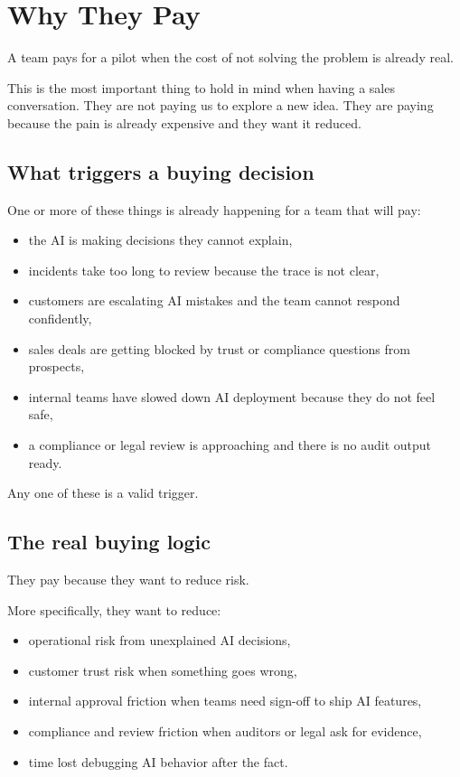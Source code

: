 \chapter{Why They Pay}

A team pays for a pilot when the cost of not solving the problem is already real.

This is the most important thing to hold in mind when having a sales conversation.
They are not paying us to explore a new idea.
They are paying because the pain is already expensive and they want it reduced.

\section{What triggers a buying decision}

One or more of these things is already happening for a team that will pay:

\begin{itemize}
  \item the AI is making decisions they cannot explain,
  \item incidents take too long to review because the trace is not clear,
  \item customers are escalating AI mistakes and the team cannot respond confidently,
  \item sales deals are getting blocked by trust or compliance questions from prospects,
  \item internal teams have slowed down AI deployment because they do not feel safe,
  \item a compliance or legal review is approaching and there is no audit output ready.
\end{itemize}

Any one of these is a valid trigger.

\section{The real buying logic}

They pay because they want to reduce risk.

More specifically, they want to reduce:

\begin{itemize}
  \item operational risk from unexplained AI decisions,
  \item customer trust risk when something goes wrong,
  \item internal approval friction when teams need sign-off to ship AI features,
  \item compliance and review friction when auditors or legal ask for evidence,
  \item time lost debugging AI behavior after the fact.
\end{itemize}

